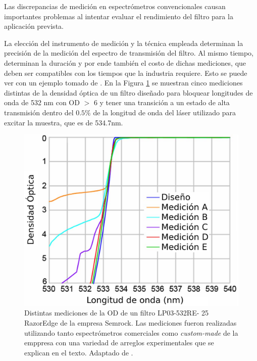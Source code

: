 \documentclass{ctuthesis}
\begin{document}
\hspace{0.5cm}Las discrepancias de medición en espectrómetros convencionales 
causan 
importantes problemas al intentar evaluar el rendimiento del filtro para la 
aplicación prevista. 

La elección del instrumento de medición y la técnica 
empleada determinan la precisión de la medición del espectro de transmisión del 
filtro. Al mismo tiempo, determinan la duración y por ende también el costo de 
dichas mediciones, que deben ser compatibles con los tiempos que la industria 
requiere. Esto se puede ver con un ejemplo tomado de \cite{Semrock}. En la 
Figura \ref{fig:may_dists} se muestran cinco mediciones distintas de 
la densidad óptica de un filtro diseñado para bloquear longitudes de onda de 
532 nm con OD $>$ 6 y tener una transición a un estado de alta transmisión 
dentro del $0.5\%$ de la longitud de onda del láser utilizado para excitar la 
muestra, que es de 534.7nm.


\begin{figure}[H]
	\centering
	\includegraphics[scale=0.8]{Figs/plan_de_tesis/dists_meds.png}
	\caption{Distintas mediciones de la OD de un filtro LP03-532RE-
		25 RazorEdge de la empresa Semrock. Las mediciones fueron realizadas 
		utilizando tanto espectrómetros comerciales como \textit{custom-made} 
		de la emppresa con una variedad de arreglos experimentales que se 
		explican en el texto. Adaptado de 
		\cite{Semrock}.}
	\label{fig:may_dists}
\end{figure}
\end{document}
